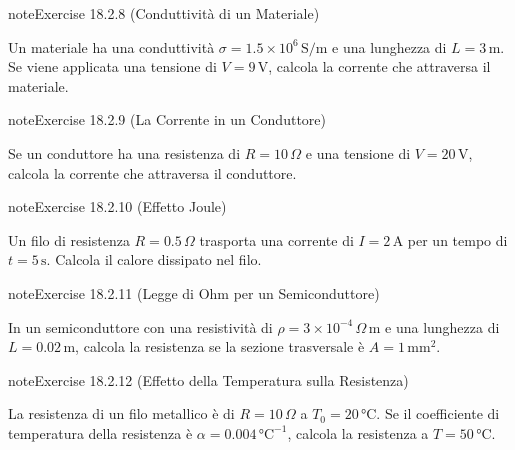 \documentclass[letterpaper,10pt,italian]{jupyterBook}
\begin{document}
\begin{sphinxadmonition}{note}{Exercise 18.2.8 (Conduttività di un Materiale)}



\sphinxAtStartPar
Un materiale ha una conduttività \(\sigma = 1.5 \times 10^6 \, \text{S/m}\) e una lunghezza di \(L = 3 \, \text{m}\). Se viene applicata una tensione di \(V = 9 \, \text{V}\), calcola la corrente che attraversa il materiale.
\end{sphinxadmonition}
 \label{exercise:ch/electromagnetism/electric-current-problems-exercise-8}

\begin{sphinxadmonition}{note}{Exercise 18.2.9 (La Corrente in un Conduttore)}



\sphinxAtStartPar
Se un conduttore ha una resistenza di \(R = 10 \, \Omega\) e una tensione di \(V = 20 \, \text{V}\), calcola la corrente che attraversa il conduttore.
\end{sphinxadmonition}
 \label{exercise:ch/electromagnetism/electric-current-problems-exercise-9}

\begin{sphinxadmonition}{note}{Exercise 18.2.10 (Effetto Joule)}



\sphinxAtStartPar
Un filo di resistenza \(R = 0.5 \, \Omega\) trasporta una corrente di \(I = 2 \, \text{A}\) per un tempo di \(t = 5 \, \text{s}\). Calcola il calore dissipato nel filo.
\end{sphinxadmonition}
 \label{exercise:ch/electromagnetism/electric-current-problems-exercise-10}

\begin{sphinxadmonition}{note}{Exercise 18.2.11 (Legge di Ohm per un Semiconduttore)}



\sphinxAtStartPar
In un semiconduttore con una resistività di \(\rho = 3 \times 10^{-4} \, \Omega \, \text{m}\) e una lunghezza di \(L = 0.02 \, \text{m}\), calcola la resistenza se la sezione trasversale è \(A = 1 \, \text{mm}^2\).
\end{sphinxadmonition}
 \label{exercise:ch/electromagnetism/electric-current-problems-exercise-11}

\begin{sphinxadmonition}{note}{Exercise 18.2.12 (Effetto della Temperatura sulla Resistenza)}



\sphinxAtStartPar
La resistenza di un filo metallico è di \(R = 10 \, \Omega\) a \(T_0 = 20 \, \text{°C}\). Se il coefficiente di temperatura della resistenza è \(\alpha = 0.004 \, \text{°C}^{-1}\), calcola la resistenza a \(T = 50 \, \text{°C}\).
\end{sphinxadmonition}
 \label{exercise:ch/electromagnetism/electric-current-problems-exercise-12}
\end{document}
